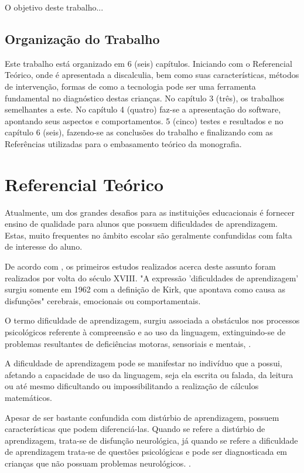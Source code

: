 \documentclass[
	12pt,				%
    oneside,			%
	a4paper,			%
	english,			%
	french,				%
	spanish,			%
	brazil,				%
	]{abntex2}
\begin{document}
O objetivo deste trabalho...



\section{Organização do Trabalho}
Este trabalho está organizado em 6 (seis) capítulos. Iniciando com o Referencial Teórico, onde é apresentada a discalculia, bem como suas características, métodos de intervenção, formas de como a tecnologia pode ser uma ferramenta fundamental no diagnóstico destas crianças. No capítulo 3 (três), os trabalhos semelhantes a este. No capítulo 4 (quatro)  faz-se a apresentação do software, apontando seus aspectos e comportamentos. 5 (cinco) testes e resultados e no capítulo 6 (seis), fazendo-se as conclusões do trabalho e finalizando com as Referências utilizadas para o embasamento teórico da monografia.
\chapter{Referencial Teórico}
Atualmente, um dos grandes desafios para as instituições educacionais é fornecer ensino de qualidade para alunos que possuem dificuldades de aprendizagem. Estas, muito frequentes no âmbito escolar são geralmente confundidas com falta de interesse do aluno.

De acordo com \cite{Coelho}, os primeiros estudos realizados acerca deste assunto foram realizados por volta do século XVIII. "A expressão 'dificuldades de aprendizagem' surgiu somente em 1962 com a definição de Kirk, que apontava como causa as disfunções" cerebrais, emocionais ou comportamentais.

O termo dificuldade de aprendizagem, surgiu associada a obstáculos nos processos psicológicos referente à compreensão e ao uso da linguagem, extinguindo-se de problemas resultantes de deficiências motoras, sensoriais e mentais, \cite{Coelho}.  

A dificuldade de aprendizagem pode se manifestar no indivíduo que a possui, afetando a capacidade de uso da linguagem, seja ela  escrita ou falada, da leitura ou até mesmo dificultando ou impossibilitando a realização de cálculos matemáticos.

Apesar de ser bastante confundida com distúrbio de aprendizagem, possuem características que podem diferenciá-las. Quando se refere a distúrbio de aprendizagem, trata-se de disfunção neurológica, já quando se refere a dificuldade de aprendizagem trata-se de questões psicológicas e pode ser diagnosticada em crianças que não possuam problemas neurológicos. \cite{Felipe}.
\end{document}

